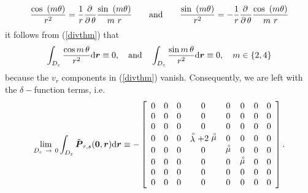 \[
{\frac{\cos\ \left({m\rm \theta 
}\right)}{{r}^{2}}}={\frac{1}{r}}{\frac{\rm \partial \rm \mit \,}{\rm 
\partial \rm \mit \,\rm \theta }}{\frac{\sin\ \left({m\rm \theta 
}\right)}{m\ r}} \qquad \mbox{and} \qquad 
{\frac{\sin\ \left({m\rm \theta 
}\right)}{{r}^{2}}}=-{\frac{1}{r}}{\frac{\rm \partial \rm \mit \,}{\rm 
\partial \rm \mit \,\rm \theta }}{\frac{\cos\ \left({m\rm \theta 
}\right)}{m\ r}}
\] 
it follows from (\ref{divthm}) that
\[
\int_{{\mit D}_{\varepsilon}}{{\cos m\,\theta }\over {{r^2}}} {\rm 
d}{\mbox{\boldmath$\mit r$\unboldmath}}\equiv 0, \quad \mbox{and}
\quad \int_{{\mit D}_{\varepsilon}}{{\sin m\,\theta }\over {{r^2}}} {\rm 
d}{\mbox{\boldmath$\mit r$\unboldmath}}\equiv 0, \quad m\in\{2,4\}
\]
because the $v_r$ components in (\ref{divthm}) vanish. Consequently, we 
are left with the $\delta-$function terms, i.e.
\begin{equation} \label{intD}
\lim\limits_{{\mit D }_{ \varepsilon }\ \rightarrow  \ 
0}\int_{{\mit D}_{ \varepsilon }}{\tilde{\bmi  P}_{r,s}}({\bf 
0},{\bmi  r}){\rm d}{\bmi r}
\equiv
-   \left[\begin{array}{cccccccc} 
   0&0&0&0&0&0&0&0\\ 0&0&0&0&0&0&0&0\\ 0&0&0&0&0&0&0&0\\
   0&0&0&\rf{\lambda}+2 \rf{\mu}&0&0&0&0\\ 0&0&0&0&\rf{\mu}&0&0&0\\
   0&0&0&0&0&\rf{\mu}&0&0\\ 0&0&0&0&0&0&0&0\\
   0&0&0&0&0&0&0&0\end{array}\right].
\end{equation}


